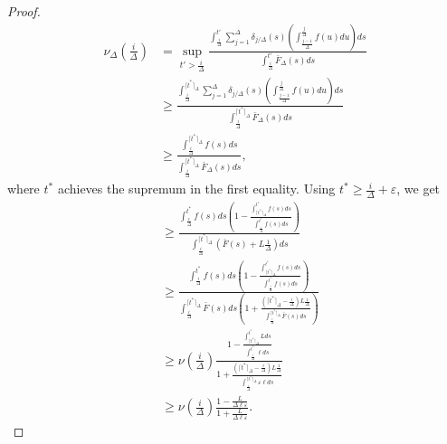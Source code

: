 \documentclass[10pt,a4paper]{amsart}
\renewcommand{\epsilon}{\varepsilon}
\renewcommand{\geq}{\geqslant}
\begin{document}
\begin{proof}
    \begin{align*}
        \nu_\Delta(\frac{i}{\Delta}) 
        &= \sup_{t'> \frac{i}{\Delta}} \frac{\int_{\frac{i}{\Delta}}^{t'}
            \sum_{j=1}^{\Delta}
         \delta_{j/\Delta}(s)  \left( \int_{\frac{j-1}{\Delta}}^{\frac{j}{\Delta}} f(u) du \right) ds}{\int_{\frac{i}{\Delta}}^{t'} \bar{F}_\Delta(s) ds}
        \\
        &\geq \frac{\int_{\frac{i}{\Delta}}^{\lceil t^* \rceil_\Delta}
        \sum_{j=1}^{\Delta}
        \delta_{j/\Delta}(s)  \left( \int_{\frac{j-1}{\Delta}}^{\frac{j}{\Delta}} f(u) du \right) ds}{\int_{\frac{i}{\Delta}}^{\lceil t^*
            \rceil_\Delta}
        \bar{F}_\Delta(s) ds} \\
        &\geq \frac {
            \int_{\frac{i}{\Delta}}^{\lceil t^* \rceil_\Delta} f(s) ds
        }{
            \int_{\frac{i}{\Delta}}^{\lceil t^* \rceil_\Delta} \bar{F}_\Delta(s) ds
          },
    \end{align*}
    where $t^*$ achieves the supremum  in the first equality.
    Using $t^* \geq \frac{i}{\Delta} + \epsilon$, we get
    \begin{align*}
        &\geq \frac{
            \int_{\frac{i}{\Delta}}^{t^*} f(s) ds\left(1 - \frac{\int_{\lceil
            t^* \rceil_\Delta}^{t^*} f(s) ds}{\int_{\frac{i}{\Delta}}^{t^*}
            f(s)ds}\right)
        }{
            \int_{\frac{i}{\Delta}}^{\lceil t^* \rceil_\Delta} (\bar{F}(s) + L\frac{1}{\Delta}) ds
        } \\
        &\geq \frac{
            \int_{\frac{i}{\Delta}}^{t^*} f(s) ds\left(1 - \frac{\int_{\lceil
            t^* \rceil_\Delta}^{t^*} f(s) ds}{\int_{\frac{i}{\Delta}}^{t^*}
            f(s)ds}\right)
        }{
            \int_{\frac{i}{\Delta}}^{\lceil t^* \rceil_\Delta} \bar{F}(s) ds \left(1 +
            \frac{(\lceil t^* \rceil_\Delta - \frac{i}{\Delta})L \frac{1}{\Delta}}{
            \int_{\frac{i}{\Delta}}^{\lceil t^* \rceil_\Delta} \bar{F}(s) ds}\right)
        } \\
        &\geq \nu(\frac{i}{\Delta}) \frac{
            1 - \frac{\int_{\lceil t^* \rceil_\Delta}^{t^*} L
            ds}{\int_{\frac{i}{\Delta}}^{t^*} \ell ds}
        }{
            1 + \frac{(\lceil t^* \rceil_\Delta - \frac{i}{\Delta})L\frac{1}{\Delta}}{
            \int_{\frac{i}{\Delta}}^{\lceil t^* \rceil_\Delta} \epsilon \ell ds}
        } \\
        &\geq \nu(\frac{i}{\Delta}) \frac{
            1 -\frac{L}{\Delta \ell \epsilon}
        }{
            1 + \frac{L}{\Delta \ell \epsilon}
        }.
    \end{align*}
\end{proof}
\end{document}
